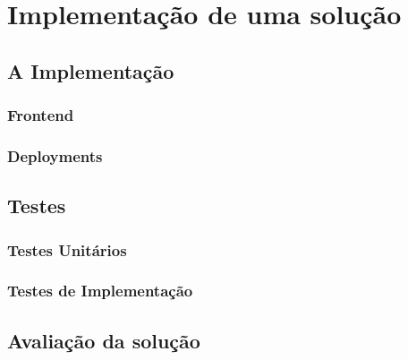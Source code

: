 \chapter{Implementação de uma solução}

\section{A Implementação}

\subsection{}

\subsection{Frontend}



\subsection{Deployments}



\section{Testes}

\subsection{Testes Unitários}

\subsection{Testes de Implementação}

\section{Avaliação da solução}